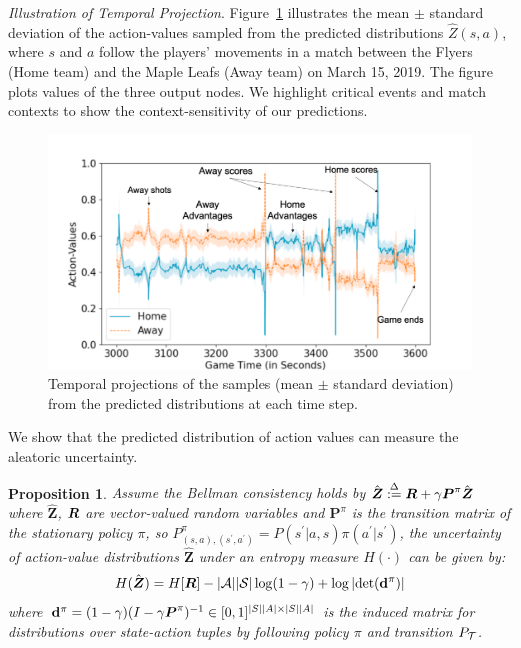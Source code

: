 \documentclass{article}
\newcommand{\state}{s}
\newcommand{\action}{a}
\newcommand{\reward}{r}
\newtheorem{proposition}{Proposition}
\begin{document}
{\it Illustration of Temporal Projection}. Figure~\ref{fig:temporal-plot} illustrates the mean $\pm$ standard deviation of the action-values sampled from the predicted distributions $\hat{Z}(\state,\action)$, where $\state$ and $\action$ follow the players' movements in a match between the Flyers (Home team) and the Maple Leafs (Away team) on March 15, 2019. The figure plots values
of the three output nodes. We highlight critical events and
match contexts to show the context-sensitivity of our predictions. 
\vspace{-0.15in}
\begin{figure}[htbp]
    \centering
    \includegraphics[scale=0.27]{figures/temporal-visualization-marked.png}
    \vspace{-0.25in}
    \caption{Temporal projections of the samples (mean $\pm$ standard deviation) from the predicted distributions at each time step.}
    \label{fig:temporal-plot}
    \vspace{-0.1in}
\end{figure}

We show that the predicted distribution of action values can measure the aleatoric uncertainty.

\begin{proposition}
Assume the Bellman consistency holds by $\hat{\boldsymbol{Z}} \overset{\Delta}{:=} \MakeUppercase{\boldsymbol{\reward}} + \gamma \boldsymbol{P}^{\pi}\hat{\boldsymbol{Z}}$ 
where $\hat{\boldsymbol{Z}}$, $\boldsymbol{\MakeUppercase{\reward}}$ are vector-valued random variables and $\boldsymbol{P}^{\pi}$ is the transition matrix of the stationary policy $\pi$, so $P^{\pi}_{(\state,\action),(\state^{\prime},\action^{\prime})}=P(\state^{\prime}|\action,\state)\pi(\action^{\prime}|\state^{\prime})$, the uncertainty of action-value distributions $\hat{\boldsymbol{Z}}$ under an entropy measure $H(\cdot)$ can be given by:
\begin{align}
    H(\hat{\boldsymbol{Z}}) = H[\boldsymbol{\MakeUppercase{\reward}}]-|\mathcal{\MakeUppercase{\action}}||\mathcal{\MakeUppercase{\state}}|\log(1-\gamma)+\log|\text{det}(\mathbf{d}^{\pi})|
\end{align}
where $\mathbf{d}^{\pi}=(1-\gamma)(I-\gamma \boldsymbol{P}^{\pi})^{-1}\in[0,1]^{|\MakeUppercase{\state}||\MakeUppercase{\action}|\times|\MakeUppercase{\state}||\MakeUppercase{\action}|}$ is the induced matrix for distributions over state-action tuples by following policy $\pi$ and transition $P_{\mathcal{\MakeUppercase{t}}}$. 
\end{proposition}
\end{document}
